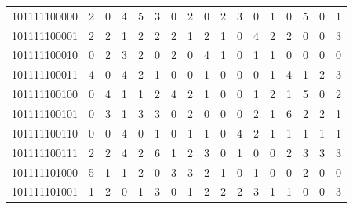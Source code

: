 \documentclass[10pt,a4paper]{article}
\begin{document}
\begin{longtable}{ |c|c|c|c|c|c|c|c|c|c|c|c|c|c|c|c|c| }
    101111100000              & 2                            & 0                                & 4                            & 5                              & 3   & 0   & 2   & 0   & 2   & 3   & 0   & 1   & 0   & 5   & 0   & 1   \\
    101111100001              & 2                            & 2                                & 1                            & 2                              & 2   & 2   & 1   & 2   & 1   & 0   & 4   & 2   & 2   & 0   & 0   & 3   \\
    101111100010              & 0                            & 2                                & 3                            & 2                              & 0   & 2   & 0   & 4   & 1   & 0   & 1   & 1   & 0   & 0   & 0   & 0   \\
    101111100011              & 4                            & 0                                & 4                            & 2                              & 1   & 0   & 0   & 1   & 0   & 0   & 0   & 1   & 4   & 1   & 2   & 3   \\
    101111100100              & 0                            & 4                                & 1                            & 1                              & 2   & 4   & 2   & 1   & 0   & 0   & 1   & 2   & 1   & 5   & 0   & 2   \\
    101111100101              & 0                            & 3                                & 1                            & 3                              & 3   & 0   & 2   & 0   & 0   & 0   & 2   & 1   & 6   & 2   & 2   & 1   \\
    101111100110              & 0                            & 0                                & 4                            & 0                              & 1   & 0   & 1   & 1   & 0   & 4   & 2   & 1   & 1   & 1   & 1   & 1   \\
    101111100111              & 2                            & 2                                & 4                            & 2                              & 6   & 1   & 2   & 3   & 0   & 1   & 0   & 0   & 2   & 3   & 3   & 3   \\
    101111101000              & 5                            & 1                                & 1                            & 2                              & 0   & 3   & 3   & 2   & 1   & 0   & 1   & 0   & 0   & 2   & 0   & 0   \\
    101111101001              & 1                            & 2                                & 0                            & 1                              & 3   & 0   & 1   & 2   & 2   & 2   & 3   & 1   & 1   & 0   & 0   & 3   \\

\end{longtable}
\end{document}
